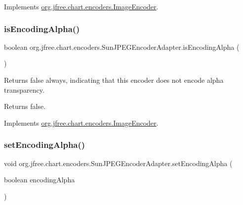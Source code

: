 Implements \mbox{\hyperlink{interfaceorg_1_1jfree_1_1chart_1_1encoders_1_1_image_encoder_a292037d46187ca04bbd3a9362bf6ad22}{org.\+jfree.\+chart.\+encoders.\+Image\+Encoder}}.

\mbox{\label{classorg_1_1jfree_1_1chart_1_1encoders_1_1_sun_j_p_e_g_encoder_adapter_a1d9fb1cf5b9a4c0db2ed038a83fd4355}} 
\subsubsection{\texorpdfstring{is\+Encoding\+Alpha()}{isEncodingAlpha()}}
{\footnotesize\ttfamily boolean org.\+jfree.\+chart.\+encoders.\+Sun\+J\+P\+E\+G\+Encoder\+Adapter.\+is\+Encoding\+Alpha (\begin{DoxyParamCaption}{ }\end{DoxyParamCaption})}

Returns {\ttfamily false} always, indicating that this encoder does not encode alpha transparency.

\begin{DoxyReturn}{Returns}
{\ttfamily false}. 
\end{DoxyReturn}


Implements \mbox{\hyperlink{interfaceorg_1_1jfree_1_1chart_1_1encoders_1_1_image_encoder_afd771eda4e4d50113696e241f5a34f2c}{org.\+jfree.\+chart.\+encoders.\+Image\+Encoder}}.

\mbox{\label{classorg_1_1jfree_1_1chart_1_1encoders_1_1_sun_j_p_e_g_encoder_adapter_ad41ef8a4ba5d9044dc3f1ac656c43504}} 
\subsubsection{\texorpdfstring{set\+Encoding\+Alpha()}{setEncodingAlpha()}}
{\footnotesize\ttfamily void org.\+jfree.\+chart.\+encoders.\+Sun\+J\+P\+E\+G\+Encoder\+Adapter.\+set\+Encoding\+Alpha (\begin{DoxyParamCaption}\item[{boolean}]{encoding\+Alpha }\end{DoxyParamCaption})}

